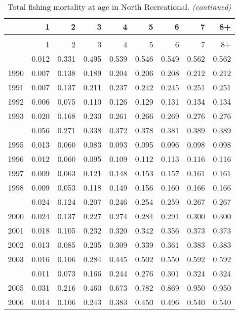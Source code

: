 \documentclass[
]{article}
\begin{document}
\begin{longtable}[t]{lrrrrrrrr}
\caption{\label{tab:North_Recreational-fleet-FAA-table}Total fishing mortality at age in North Recreational.}\\
\toprule
  & 1 & 2 & 3 & 4 & 5 & 6 & 7 & 8+\\
\midrule
\endfirsthead
\caption[]{Total fishing mortality at age in North Recreational. \textit{(continued)}}\\
\toprule
  & 1 & 2 & 3 & 4 & 5 & 6 & 7 & 8+\\
\midrule
\endhead

\endfoot
\bottomrule
\endlastfoot
1989 & 0.012 & 0.331 & 0.495 & 0.539 & 0.546 & 0.549 & 0.562 & 0.562\\
1990 & 0.007 & 0.138 & 0.189 & 0.204 & 0.206 & 0.208 & 0.212 & 0.212\\
1991 & 0.007 & 0.137 & 0.211 & 0.237 & 0.242 & 0.245 & 0.251 & 0.251\\
1992 & 0.006 & 0.075 & 0.110 & 0.126 & 0.129 & 0.131 & 0.134 & 0.134\\
1993 & 0.020 & 0.168 & 0.230 & 0.261 & 0.266 & 0.269 & 0.276 & 0.276\\
\addlinespace
1994 & 0.056 & 0.271 & 0.338 & 0.372 & 0.378 & 0.381 & 0.389 & 0.389\\
1995 & 0.013 & 0.060 & 0.083 & 0.093 & 0.095 & 0.096 & 0.098 & 0.098\\
1996 & 0.012 & 0.060 & 0.095 & 0.109 & 0.112 & 0.113 & 0.116 & 0.116\\
1997 & 0.009 & 0.063 & 0.121 & 0.148 & 0.153 & 0.157 & 0.161 & 0.161\\
1998 & 0.009 & 0.053 & 0.118 & 0.149 & 0.156 & 0.160 & 0.166 & 0.166\\
\addlinespace
1999 & 0.024 & 0.124 & 0.207 & 0.246 & 0.254 & 0.259 & 0.267 & 0.267\\
2000 & 0.024 & 0.137 & 0.227 & 0.274 & 0.284 & 0.291 & 0.300 & 0.300\\
2001 & 0.018 & 0.105 & 0.232 & 0.320 & 0.342 & 0.356 & 0.373 & 0.373\\
2002 & 0.013 & 0.085 & 0.205 & 0.309 & 0.339 & 0.361 & 0.383 & 0.383\\
2003 & 0.016 & 0.106 & 0.284 & 0.445 & 0.502 & 0.550 & 0.592 & 0.592\\
\addlinespace
2004 & 0.011 & 0.073 & 0.166 & 0.244 & 0.276 & 0.301 & 0.324 & 0.324\\
2005 & 0.031 & 0.216 & 0.460 & 0.673 & 0.782 & 0.869 & 0.950 & 0.950\\
2006 & 0.014 & 0.106 & 0.243 & 0.383 & 0.450 & 0.496 & 0.540 & 0.540\\

\end{longtable}
\end{document}
